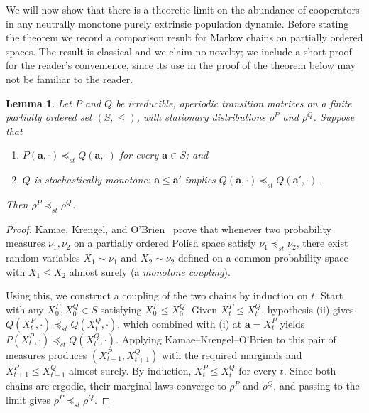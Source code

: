 \documentclass{article}
\newtheorem{lemma}{Lemma}
\begin{document}
We will now show that there is a theoretic limit on the abundance of cooperators
in any neutrally monotone purely extrinsic population dynamic. Before stating the
theorem we record a comparison result for Markov chains on partially ordered
spaces. The result is classical and we claim no novelty; we include a short
proof for the reader's convenience, since its use in the proof of the theorem
below may not be familiar to the reader.

\begin{lemma}\label{lem:stationary-dominance}
    Let \(P\) and \(Q\) be irreducible, aperiodic transition matrices on a
    finite partially ordered set \((S, \leq)\), with stationary distributions
    \(\rho^P\) and \(\rho^Q\). Suppose that
    \begin{enumerate}
        \item[(i)] \(P(\mathbf{a}, \cdot) \preceq_{st} Q(\mathbf{a}, \cdot)\) for
        every \(\mathbf{a} \in S\); and
        \item[(ii)] \(Q\) is stochastically monotone: \(\mathbf{a} \leq
        \mathbf{a}'\) implies \(Q(\mathbf{a}, \cdot) \preceq_{st} Q(\mathbf{a}',
        \cdot)\).
    \end{enumerate}
    Then \(\rho^P \preceq_{st} \rho^Q\).
\end{lemma}

\begin{proof}
    Kamae, Krengel, and O'Brien~\cite{kamae1977stochastic} prove that
    whenever two probability measures \(\nu_1, \nu_2\) on a partially ordered
    Polish space satisfy \(\nu_1 \preceq_{st} \nu_2\), there exist random
    variables \(X_1 \sim \nu_1\) and \(X_2 \sim \nu_2\) defined on a common
    probability space with \(X_1 \leq X_2\) almost surely (a \emph{monotone
    coupling}).

    Using this, we construct a coupling of the two chains by induction on \(t\).
    Start with any \(X^P_0, X^Q_0 \in S\) satisfying \(X^P_0 \leq X^Q_0\). Given
    \(X^P_t \leq X^Q_t\), hypothesis (ii) gives \(Q(X^P_t, \cdot) \preceq_{st}
    Q(X^Q_t, \cdot)\), which combined with (i) at \(\mathbf{a} = X^P_t\) yields
    \(P(X^P_t, \cdot) \preceq_{st} Q(X^Q_t, \cdot)\). Applying
    Kamae--Krengel--O'Brien to this pair of measures produces \((X^P_{t+1},
    X^Q_{t+1})\) with the required marginals and \(X^P_{t+1} \leq X^Q_{t+1}\)
    almost surely. By induction, \(X^P_t \leq X^Q_t\) for every \(t\). Since both
    chains are ergodic, their marginal laws converge to \(\rho^P\) and \(\rho^Q\), and
    passing to the limit gives \(\rho^P \preceq_{st} \rho^Q\).
\end{proof}
\end{document}

